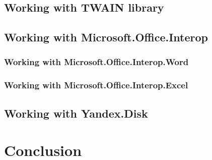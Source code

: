 \documentclass[12pt,journal,compsoc]{D:/Магистратура/English/bare_conf/IEEEtran}
\begin{document}
\subsection{Working with TWAIN library}

\subsection{Working with Microsoft.Office.Interop}

\subsubsection{Working with Microsoft.Office.Interop.Word}

\subsubsection{Working with Microsoft.Office.Interop.Excel}

\subsection{Working with Yandex.Disk}

\section{Conclusion}
\end{document}
